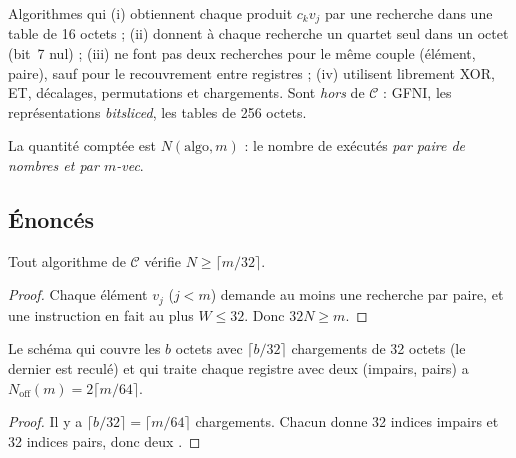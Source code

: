 \begin{definition}
Algorithmes qui (i) obtiennent chaque produit $c_kv_j$ par une recherche dans une table de 16 octets ; (ii) donnent à chaque recherche un quartet seul dans un octet (bit~7 nul) ; (iii) ne font pas deux recherches pour le même couple (élément, paire), sauf pour le recouvrement entre registres ; (iv) utilisent librement XOR, ET, décalages, permutations et chargements. Sont \emph{hors} de $\mathcal{C}$ : GFNI, les représentations \emph{bitsliced}, les tables de 256 octets.
\end{definition}
La quantité comptée est $N(\text{algo},m)$ : le nombre de \vpshufb{} exécutés \emph{par paire de nombres et par $m$-vec}.

\subsection{Énoncés}
\begin{proposition}[Limite]\label{prop:borne}
Tout algorithme de $\mathcal{C}$ vérifie $N\ge\lceil m/32\rceil$.
\end{proposition}
\begin{proof}
Chaque élément $v_j$ ($j<m$) demande au moins une recherche par paire, et une instruction en fait au plus $W\le32$. Donc $32N\ge m$.
\end{proof}

\begin{proposition}\label{prop:off}
Le schéma qui couvre les $b$ octets avec $\lceil b/32\rceil$ chargements de 32 octets (le dernier est reculé) et qui traite chaque registre avec deux \vpshufb{} (impairs, pairs) a $N_{\mathrm{off}}(m)=2\lceil m/64\rceil$.
\end{proposition}
\begin{proof}
Il y a $\lceil b/32\rceil=\lceil m/64\rceil$ chargements. Chacun donne 32 indices impairs et 32 indices pairs, donc deux \vpshufb{}.
\end{proof}

